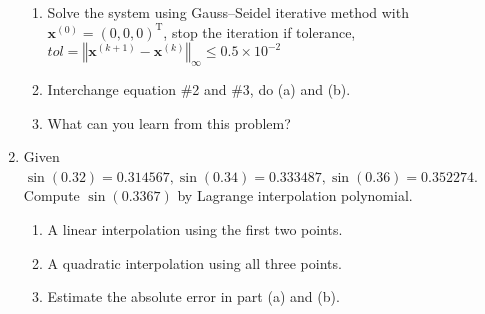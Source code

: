 \documentclass[10pt]{report}
\newcommand{\norm}[2][\infty] {\left\Vert \mathbf{#2} \right\Vert_#1}
\begin{document}
\begin{enumerate}
\begin{enumerate}
		\item 
		Solve the system using Gauss--Seidel iterative method with $\mathbf{x}^{(0)} = (0, 0, 0)^\mathrm{T}$, stop the iteration if tolerance, $tol = \norm{x^{(\mathit k + \mathrm 1)} - x^{(\mathit{k})}} \le 0.5\times 10^{-2}$
		
		\item 
		Interchange equation \#2 and \#3, do (a) and (b).
		
		\item 
		What can you learn from this problem?
	\end{enumerate}

	\item 
	Given $\sin(0.32)=0.314567, \sin(0.34)=0.333487, \sin(0.36)=0.352274$. Compute $\sin(0.3367)$ by Lagrange interpolation polynomial.
	\begin{enumerate}
		\item 
		A linear interpolation using the first two points.
		
		\item 
		A quadratic interpolation using all three points.
		
		\item 
		Estimate the absolute error in part (a) and (b).
	\end{enumerate}
\end{enumerate}
\end{document}
